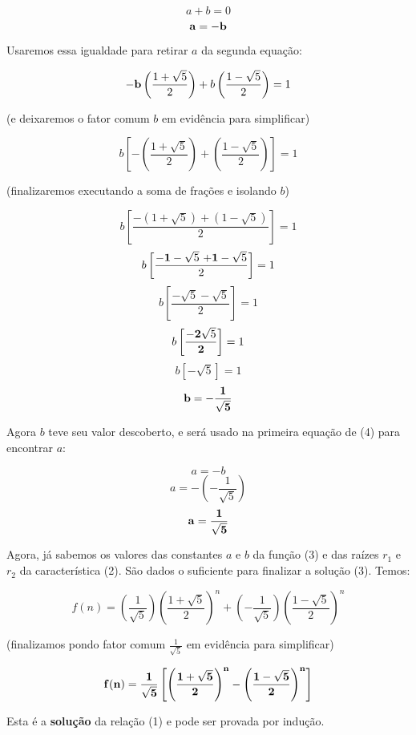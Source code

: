 \documentclass[12pt]{article}
\begin{document}
$$
a + b = 0
$$
$$
{\bf a = -b}
$$

Usaremos essa igualdade para retirar $a$ da segunda equação:

$$
{\bf -b}\left( \frac{1 + \sqrt{5}}{2} \right)
+
b\left( \frac{1 - \sqrt{5}}{2} \right)
=
1
$$

(e deixaremos o fator comum $b$ em evidência para simplificar)

$$
b\left[ - \left( \frac{1 + \sqrt{5}}{2} \right)
+
\left( \frac{1 - \sqrt{5}}{2} \right) \right]
=
1
$$

(finalizaremos executando a soma de frações e isolando $b$)


$$
b\left[ \frac{-(1 + \sqrt{5}) + (1 - \sqrt{5}) }{2} \right] = 1
$$
$$
b\left[ \frac{{\bf - 1} - \sqrt{5}\ {\bf + 1} - \sqrt{5} }{2} \right] = 1
$$
$$
b\left[ \frac{- \sqrt{5} - \sqrt{5} }{2} \right] = 1
$$
$$
b\left[ \frac{- {\bf 2}\sqrt{5} }{\bf 2} \right] = 1
$$
$$
b\left[ - \sqrt{5} \right] = 1
$$
$$
{\bf b = -\frac{1}{\sqrt{5}}}
$$

Agora $b$ teve seu valor descoberto, e será usado na
primeira equação de (4) para encontrar $a$:

$$
a = -b
$$
$$
a = -\left( - \frac{1}{\sqrt{5}} \right)
$$
$$
{\bf a = \frac{1}{\sqrt{5}}}
$$

Agora, já sabemos os valores das constantes $a$ e $b$ da função (3)
e das raízes $r_1$ e $r_2$ da característica (2). São dados o
suficiente para finalizar a solução (3).
Temos:

$$
f(n) =
\left( \frac{1}{\sqrt{5}} \right)
\left( \frac{1 + \sqrt{5}}{2} \right)^n
+
\left( -\frac{1}{\sqrt{5}} \right)
\left( \frac{1 - \sqrt{5}}{2} \right)^n
$$

(finalizamos pondo fator comum $\frac{1}{\sqrt{5}}$ em
evidência para simplificar)


$$
\bf
f(n) =
\frac{1}{\sqrt{5}}
\left[
\left( \frac{1 + \sqrt{5}}{2} \right)^n
-
\left( \frac{1 - \sqrt{5}}{2} \right)^n
\right]
$$

Esta é a {\bf solução} da relação (1) e pode ser provada
por indução.
\end{document}
